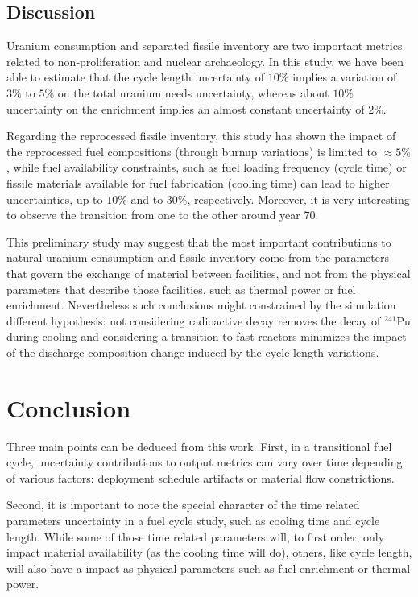 \documentclass{anstrans}
\begin{document}
\subsection{Discussion}

Uranium consumption and separated fissile inventory are two important metrics
related to non-proliferation and nuclear archaeology.  In this study, we have
been able to estimate that the cycle length uncertainty of $10\%$ implies a
variation of $3\%$ to $5\%$ on the total uranium needs uncertainty, whereas about
$10\%$ uncertainty on the enrichment implies an almost constant uncertainty of $2\%$.

Regarding the reprocessed fissile inventory, this study has shown the impact of
the reprocessed fuel compositions (through burnup variations) is limited to
$\approx5\%$, while fuel availability constraints, such as fuel loading
frequency (cycle time) or fissile materials available for fuel fabrication
(cooling time) can lead to higher uncertainties, up to $10\%$ and to $30\%$,
respectively.  Moreover, it is very interesting to observe the transition from
one to the other around year 70.

This preliminary study may suggest that the most important contributions to
natural uranium consumption and fissile inventory come from the parameters that
govern the exchange of material between facilities, and not from the physical
parameters that describe those facilities, such as thermal power or fuel
enrichment. Nevertheless such conclusions might constrained by the simulation
different hypothesis: not considering radioactive decay removes the decay of
$^{241}$Pu during cooling and considering a transition to fast reactors
minimizes the impact of the discharge composition change induced by the cycle
length variations.

\section{Conclusion}

Three main points can be deduced from this work.  First, in a transitional fuel
cycle, uncertainty contributions to output metrics can vary over time depending
of various factors: deployment schedule artifacts or material flow
constrictions.

Second, it is important to note the special character of the time related
parameters uncertainty in a fuel cycle study, such as cooling time and cycle
length.  While some of those time related parameters will, to first order, only
impact material availability (as the cooling time will do), others, like cycle
length, will also have a impact as physical parameters such as fuel enrichment
or thermal power.  
\end{document}
